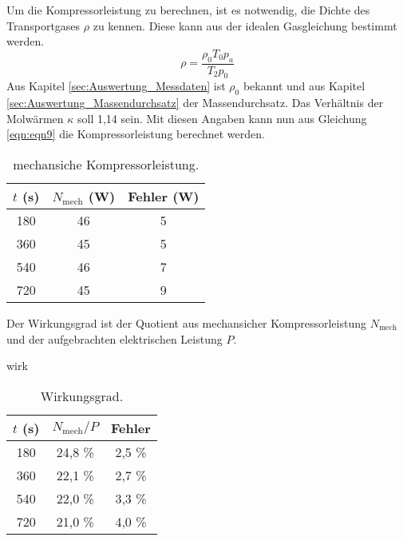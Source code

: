 Um die Kompressorleistung zu berechnen, ist es notwendig, die Dichte des Transportgases $\rho$ zu kennen.
Diese kann aus der idealen Gasgleichung bestimmt werden.
\begin{equation*}
 \rho = \frac{\rho_0 T_0 p_a}{T_2 p_0}
\end{equation*}
Aus Kapitel \ref{sec:Auswertung_Messdaten} ist $\rho_0$ bekannt und aus Kapitel \ref{sec:Auswertung_Massendurchsatz} der Massendurchsatz.
Das Verhältnis der Molwärmen $\kappa$ soll 1,14 sein.
Mit diesen Angaben kann nun aus Gleichung \eqref{eqn:eqn9} die Kompressorleistung berechnet werden.
\begin{table}
  \centering
  \caption{mechansiche Kompressorleistung.}
  \label{tab:Leistung}
  \begin{tabular}{c c c}
    \toprule
    $t$ (s) & $N_{\text{mech}}$ (W) & Fehler (W) \\
    \midrule
    180 & 46 & 5 \\
    360 & 45 & 5 \\
    540 & 46 & 7 \\
    720 & 45 & 9 \\
    \bottomrule
  \end{tabular}
\end{table}
\FloatBarrier
Der Wirkungsgrad ist der Quotient aus mechansicher Kompressorleistung $N_\text{mech}$ und der aufgebrachten elektrischen Leistung $P$.
\begin{table} wirk
  \centering
  \caption{Wirkungsgrad.}
  \label{tab:Wirkungsgrad}
  \begin{tabular}{c c c}
    \toprule
    $t$ (s) & $N_{\text{mech}}/P$ & Fehler \\
    \midrule
    180 & 24,8 \% & 2,5 \% \\
    360 & 22,1 \% & 2,7 \% \\
    540 & 22,0 \% & 3,3 \% \\
    720 & 21,0 \% & 4,0 \% \\
    \bottomrule
  \end{tabular}
\end{table}

